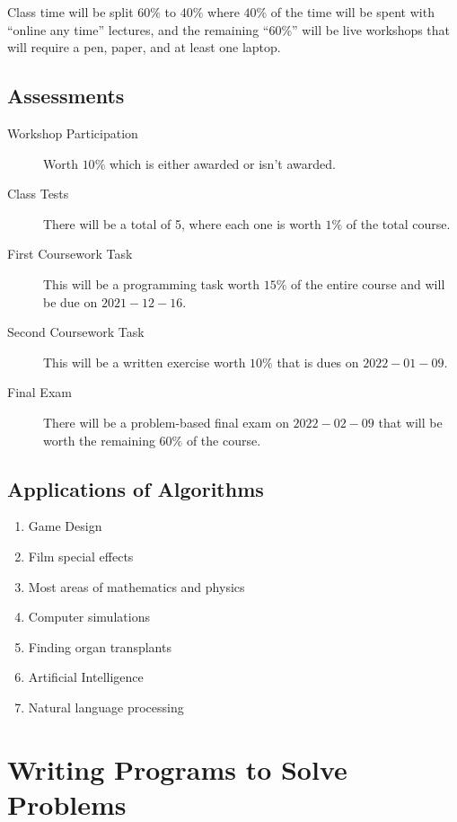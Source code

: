 Class time will be split \(60\%\) to \(40\%\) where \(40\%\) of the time will be spent with ``online any time'' lectures, and the remaining ``60\%'' will be live workshops that will require a pen, paper, and at least one laptop.

\subsection{Assessments}\label{sub:pa_assessments}

\begin{description}
    \item[Workshop Participation] Worth \(10\%\) which is either awarded or isn't awarded.
    \item[Class Tests] There will be a total of 5, where each one is worth \(1\%\) of the total course.
    \item[First Coursework Task] This will be a programming task worth \(15\%\) of the entire course and will be due on \(2021-12-16\).
    \item[Second Coursework Task] This will be a written exercise worth \(10\%\) that is dues on \(2022-01-09\).
    \item[Final Exam] There will be a problem-based final exam on \(2022-02-09\) that will be worth the remaining \(60\%\) of the course.
\end{description}

\subsection{Applications of Algorithms}\label{sub:applications_of_algorithms}

\begin{enumerate}
    \item Game Design
    \item Film special effects
    \item Most areas of mathematics and physics
    \item Computer simulations
    \item Finding organ transplants
    \item Artificial Intelligence
    \item Natural language processing
\end{enumerate}

\section{Writing Programs to Solve Problems}\label{sec:writing_programs_to_solve_problems}


